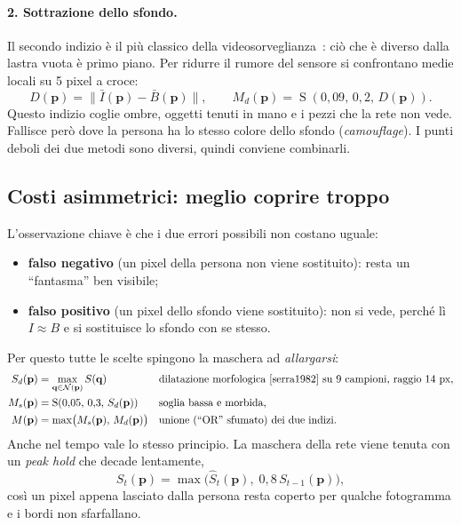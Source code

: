 \documentclass[11pt,a4paper]{article}
\newcommand{\Sm}{\operatorname{S}}
\newcommand{\vect}[1]{\mathbf{#1}}
\begin{document}
\paragraph{2. Sottrazione dello sfondo.} Il secondo indizio è il più classico della
videosorveglianza~\cite{piccardi2004background}: ciò che è diverso dalla lastra vuota è primo
piano. Per ridurre il rumore del sensore si confrontano medie locali su 5 pixel a croce:
\begin{equation}
  D(\vect{p})=\bigl\|\bar I(\vect{p})-\bar B(\vect{p})\bigr\|,\qquad
  M_d(\vect{p})=\Sm(0{,}09,\,0{,}2,\,D(\vect{p})).
\end{equation}
Questo indizio coglie ombre, oggetti tenuti in mano e i pezzi che la rete non vede. Fallisce però
dove la persona ha lo stesso colore dello sfondo (\emph{camouflage}). I punti deboli dei due
metodi sono diversi, quindi conviene combinarli.

\subsection{Costi asimmetrici: meglio coprire troppo}
L'osservazione chiave è che i due errori possibili non costano uguale:
\begin{itemize}
  \item \textbf{falso negativo} (un pixel della persona non viene sostituito): resta un ``fantasma''
  ben visibile;
  \item \textbf{falso positivo} (un pixel dello sfondo viene sostituito): non si vede, perché lì
  $I\approx B$ e si sostituisce lo sfondo con se stesso.
\end{itemize}
Per questo tutte le scelte spingono la maschera ad \emph{allargarsi}:
\begin{align}
  S_d(\vect{p}) &= \max_{\vect{q}\in\mathcal{N}(\vect{p})} S(\vect{q})
     &&\text{dilatazione morfologica~\cite{serra1982} su 9 campioni, raggio 14 px},\\
  M_s(\vect{p}) &= \Sm(0{,}05,\,0{,}3,\,S_d(\vect{p}))
     &&\text{soglia bassa e morbida},\\
  M(\vect{p}) &= \max\bigl(M_s(\vect{p}),\,M_d(\vect{p})\bigr)
     &&\text{unione (``OR'' sfumato) dei due indizi}.
\end{align}
Anche nel tempo vale lo stesso principio. La maschera della rete viene tenuta con un
\emph{peak hold} che decade lentamente,
\begin{equation}
  S_t(\vect{p})=\max\bigl(\hat S_t(\vect{p}),\;0{,}8\,S_{t-1}(\vect{p})\bigr),
\end{equation}
così un pixel appena lasciato dalla persona resta coperto per qualche fotogramma e i bordi non
sfarfallano.
\end{document}
